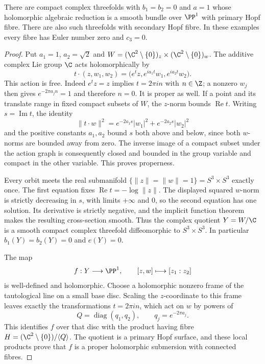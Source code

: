 
\begin{proposition}\label{cdp:st:C.3.6}

There are compact complex threefolds with $b_1=b_2=0$ and $a=1$
whose holomorphic algebraic reduction is a smooth bundle over
$\PP^1$ with primary Hopf fibre. There are also such threefolds
with secondary Hopf fibre. In these examples every fibre has Euler
number zero and $c_3=0$.
\end{proposition}
\begin{proof}
Put $a_1=1$, $a_2=\sqrt2$ and
$W=(\C^2\setminus\{0\})_z\times(\C^2\setminus\{0\})_w$.
The additive complex Lie group $\C$ acts holomorphically by
\[
t\cdot(z,w_1,w_2)
 =\bigl(e^t z,e^{ia_1t}w_1,e^{ia_2t}w_2\bigr).
\tag{C.H.1}\label{cdp:eq:C.H.1}
\]
This action is free. Indeed $e^t z=z$ implies $t=2\pi in$ with
$n\in\Z$; a nonzero $w_j$ then gives $e^{-2\pi a_jn}=1$ and
therefore $n=0$. It is proper as well. If a point and its translate
range in fixed compact subsets of $W$, the $z$-norm bounds
$\operatorname{Re}t$. Writing $s=\operatorname{Im}t$, the identity
\[
\|t\cdot w\|^2
 =e^{-2a_1s}|w_1|^2+e^{-2a_2s}|w_2|^2
\]
and the positive constants $a_1,a_2$ bound $s$ both above and
below, since both $w$-norms are bounded away from zero. The inverse
image of a compact subset under the action graph is consequently
closed and bounded in the group variable and compact in the other
variable. This proves properness.

Every orbit meets the real submanifold
$\{\|z\|=\|w\|=1\}=S^3\times S^3$ exactly once.
The first equation fixes $\operatorname{Re}t=-\log\|z\|$.
The displayed squared $w$-norm is strictly decreasing in $s$,
with limits $+\infty$ and $0$, so the second equation has one
solution. Its derivative is strictly negative, and the implicit
function theorem makes the resulting cross-section smooth.
Thus the complex quotient $Y=W/\C$ is a smooth compact complex
threefold diffeomorphic to $S^3\times S^3$. In particular
$b_1(Y)=b_2(Y)=0$ and $e(Y)=0$.

The map
\[
f:Y\longrightarrow\PP^1,\qquad [z,w]\longmapsto[z_1:z_2]
\]
is well-defined and holomorphic. Choose a holomorphic nonzero
frame of the tautological line on a small base disc. Scaling the
$z$-coordinate to this frame leaves exactly the transformations
$t=2\pi in$, which act on $w$ by powers of
\[
Q=\operatorname{diag}(q_1,q_2),\qquad
q_j=e^{-2\pi a_j}.
\]
This identifies $f$ over that disc with the product having fibre
$H=(\C^2\setminus\{0\})/\langle Q\rangle$.
The quotient is a primary Hopf surface, and these local products
prove that $f$ is a proper holomorphic submersion with connected
fibres.


\end{proof}

